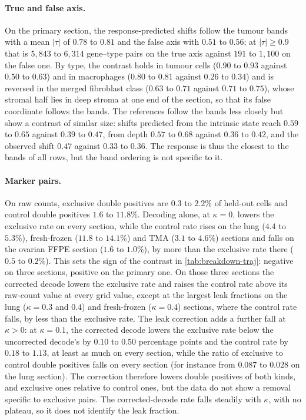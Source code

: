\paragraph{True and false axis.} On the primary section, the response-predicted shifts follow the tumour bands with a mean $|\tau|$ of $0.78$ to $0.81$ and the false axis with $0.51$ to $0.56$; at $|\tau| \geq 0.9$ that is $5{,}843$ to $6{,}314$ gene--type pairs on the true axis against $191$ to $1{,}100$ on the false one. By type, the contrast holds in tumour cells ($0.90$ to $0.93$ against $0.50$ to $0.63$) and in macrophages ($0.80$ to $0.81$ against $0.26$ to $0.34$) and is reversed in the merged fibroblast class ($0.63$ to $0.71$ against $0.71$ to $0.75$), whose stromal half lies in deep stroma at one end of the section, so that its false coordinate follows the bands. The references follow the bands less closely but show a contrast of similar size: shifts predicted from the intrinsic state reach $0.59$ to $0.65$ against $0.39$ to $0.47$, from depth $0.57$ to $0.68$ against $0.36$ to $0.42$, and the observed shift $0.47$ against $0.33$ to $0.36$. The response is thus the closest to the bands of all rows, but the band ordering is not specific to it.

\paragraph{Marker pairs.} On raw counts, exclusive double positives are $0.3$ to $2.2\%$ of held-out cells and control double positives $1.6$ to $11.8\%$. Decoding alone, at $\kappa = 0$, lowers the exclusive rate on every section, while the control rate rises on the lung ($4.4$ to $5.3\%$), fresh-frozen ($11.8$ to $14.1\%$) and TMA ($3.1$ to $4.6\%$) sections and falls on the ovarian FFPE section ($1.6$ to $1.0\%$), by more than the exclusive rate there ($0.5$ to $0.2\%$). This sets the sign of the contrast in \cref{tab:breakdown-traj}: negative on three sections, positive on the primary one. On those three sections the corrected decode lowers the exclusive rate and raises the control rate above its raw-count value at every grid value, except at the largest leak fractions on the lung ($\kappa = 0.3$ and $0.4$) and fresh-frozen ($\kappa = 0.4$) sections, where the control rate falls, by less than the exclusive rate. The leak correction adds a further fall at $\kappa > 0$: at $\kappa = 0.1$, the corrected decode lowers the exclusive rate below the uncorrected decode's by $0.10$ to $0.50$ percentage points and the control rate by $0.18$ to $1.13$, at least as much on every section, while the ratio of exclusive to control double positives falls on every section (for instance from $0.087$ to $0.028$ on the lung section). The correction therefore lowers double positives of both kinds, and exclusive ones relative to control ones, but the data do not show a removal specific to exclusive pairs. The corrected-decode rate falls steadily with $\kappa$, with no plateau, so it does not identify the leak fraction.

